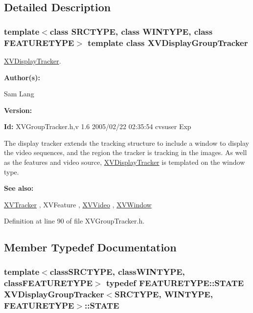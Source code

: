 \subsection{Detailed Description}
\subsubsection*{template$<$class SRCTYPE, class WINTYPE, class FEATURETYPE$>$  template class XVDisplay\-Group\-Tracker}

\hyperlink{class_XVDisplayTracker}{XVDisplay\-Tracker}.

\begin{Desc}
\item[{\bf Author(s): }]\par
 Sam Lang \end{Desc}
\begin{Desc}
\item[{\bf Version: }]\par
 \end{Desc}
\begin{Desc}
\item[{\bf Id: }] XVGroup\-Tracker.h,v 1.6 2005/02/22 02:35:54 cvsuser Exp \end{Desc}


The display tracker extends the tracking structure to include a window to display the video sequences, and the region the tracker is tracking in the images. As well as the features and video source, \hyperlink{class_XVDisplayTracker}{XVDisplay\-Tracker} is templated on the window type.

\begin{Desc}
\item[{\bf See also: }]\par
 \hyperlink{class_XVTracker}{XVTracker} ,  XVFeature ,  \hyperlink{class_XVVideo}{XVVideo} ,  \hyperlink{class_XVWindow}{XVWindow} \end{Desc}




Definition at line 90 of file XVGroup\-Tracker.h.

\subsection{Member Typedef Documentation}
\label{XVDisplayGroupTracker_s0}
\hypertarget{class_XVDisplayGroupTracker_s0}{
\subsubsection[STATE]{\setlength{\rightskip}{0pt plus 5cm}template$<$classSRCTYPE, classWINTYPE, classFEATURETYPE$>$ typedef FEATURETYPE::STATE XVDisplay\-Group\-Tracker$<$SRCTYPE, WINTYPE, FEATURETYPE$>$::STATE}}




